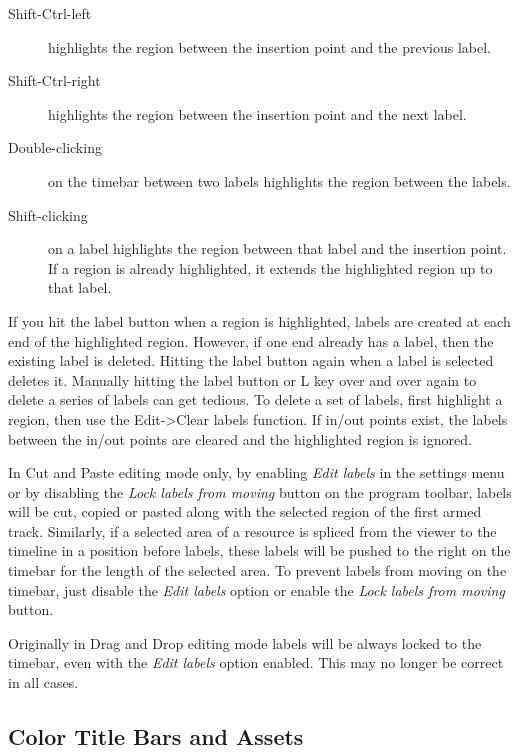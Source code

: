 \begin{description}
    \item[Shift-Ctrl-left] highlights the region between the insertion point and the previous label.
    \item[Shift-Ctrl-right] highlights the region between the insertion point and the next label.
    \item[Double-clicking] on the timebar between two labels highlights the region between the labels.	   
    \item[Shift-clicking] on a label highlights the region between that label and the insertion point.
        If a region is already highlighted, it extends the highlighted region up to that label.
\end{description}


If you hit the label button when a region is highlighted, labels are created at each end of the highlighted region. 
However, if one end already has a label, then the existing label is deleted. 
Hitting the label button again when a label is selected deletes it. 
Manually hitting the label button or L key over and over again to delete a series of labels can get tedious. 
To delete a set of labels, first highlight a region, then use the Edit->Clear labels function. 
If in/out points exist, the labels between the in/out points are cleared and the highlighted region is ignored.


In Cut and Paste editing mode only, by enabling \emph{Edit labels} in the settings menu or by disabling the \emph{Lock labels from moving} button on the program toolbar, labels will be cut, copied or pasted along with the selected region of the first armed track. 
Similarly, if a selected area of a resource is spliced from the viewer to the timeline in a position before labels, these labels will be pushed to the right on the timebar for the length of the selected area. 
To prevent labels from moving on the timebar, just disable the \emph{Edit labels} option or enable the \emph{Lock labels from moving} button.


Originally in Drag and Drop editing mode labels will be always locked to the timebar, even with the \emph{Edit labels} option enabled.  
This may no longer be correct in all cases. 

\subsection{Color Title Bars and Assets}%
\label{sub:color_title_bars_and_assets}


